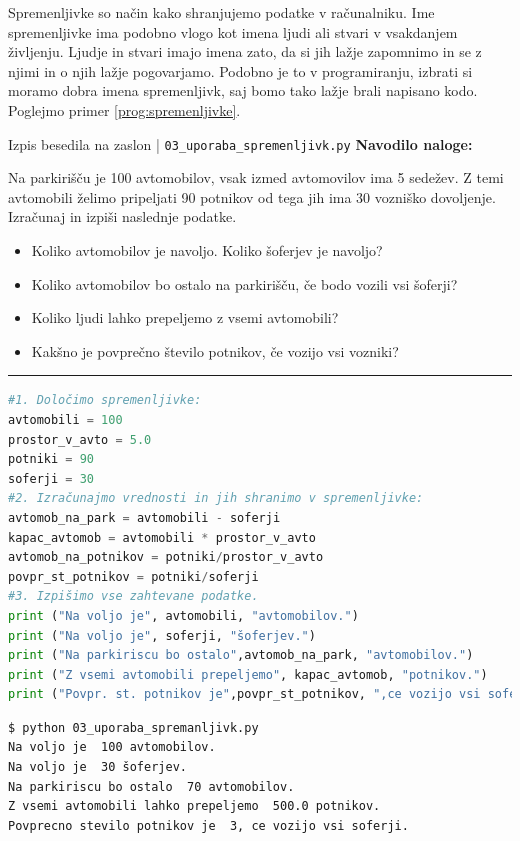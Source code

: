 Spremenljivke so način kako shranjujemo podatke v računalniku.  Ime
spremenljivke ima podobno vlogo kot imena ljudi ali stvari v
vsakdanjem življenju. Ljudje in stvari imajo imena zato, da si jih
lažje zapomnimo in se z njimi in o njih lažje pogovarjamo. Podobno je
to v programiranju, izbrati si moramo dobra imena spremenljivk, saj
bomo tako lažje brali napisano kodo. Poglejmo primer
\ref{prog:spremenljivke}.

\begin{examplebox}[label={prog:spremenljivke}]{Izpis besedila na
    zaslon | \texttt{03\_uporaba\_spremenljivk.py} \cite{web:PTHardWay}}
\textbf{Navodilo naloge:}

Na parkirišču je 100 avtomobilov, vsak izmed avtomovilov ima 5
sedežev. Z temi avtomobili želimo pripeljati 90 potnikov od tega jih
ima 30 vozniško dovoljenje. Izračunaj in izpiši naslednje podatke.
\begin{itemize}
\item Koliko avtomobilov je navoljo.  Koliko šoferjev je navoljo?
\item Koliko avtomobilov bo ostalo na parkirišču, če bodo vozili vsi
  šoferji?
\item Koliko ljudi lahko prepeljemo z vsemi avtomobili?
\item Kakšno je povprečno število potnikov, če vozijo vsi vozniki?
\end{itemize}
\rule{\textwidth}{.4pt}
\begin{lstlisting}[language=Python]
#1. Določimo spremenljivke:
avtomobili = 100
prostor_v_avto = 5.0
potniki = 90
soferji = 30
#2. Izračunajmo vrednosti in jih shranimo v spremenljivke:
avtomob_na_park = avtomobili - soferji
kapac_avtomob = avtomobili * prostor_v_avto
avtomob_na_potnikov = potniki/prostor_v_avto
povpr_st_potnikov = potniki/soferji
#3. Izpišimo vse zahtevane podatke.
print ("Na voljo je", avtomobili, "avtomobilov.")
print ("Na voljo je", soferji, "šoferjev.")
print ("Na parkiriscu bo ostalo",avtomob_na_park, "avtomobilov.")
print ("Z vsemi avtomobili prepeljemo", kapac_avtomob, "potnikov.")
print ("Povpr. st. potnikov je",povpr_st_potnikov, ",ce vozijo vsi soferji.")
\end{lstlisting}
\tcblower
\begin{Verbatim}[fontsize=\footnotesize]
$ python 03_uporaba_spremanljivk.py
Na voljo je  100 avtomobilov.
Na voljo je  30 šoferjev.
Na parkiriscu bo ostalo  70 avtomobilov.
Z vsemi avtomobili lahko prepeljemo  500.0 potnikov.
Povprecno stevilo potnikov je  3, ce vozijo vsi soferji.
\end{Verbatim}
\end{examplebox}

